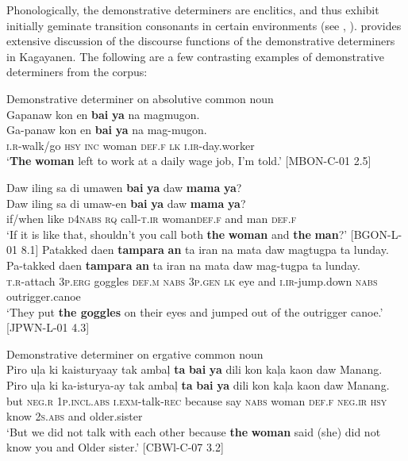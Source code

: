 Phonologically, the demonstrative determiners are enclitics, and thus exhibit initially geminate transition consonants in certain environments (see , ).  \citet{pebleyenclitic1999} provides extensive discussion of the discourse functions of the demonstrative determiners in Kagayanen. The following are a few contrasting examples of demonstrative determiners from the corpus:

\largerpage
\ea
Demonstrative determiner on absolutive common noun \\
Gapanaw  kon  en  \textbf{bai}  \textbf{ya}  na  magmugon. \\\smallskip
 \gll Ga-panaw  kon  en  \textbf{bai}  \textbf{ya}  na  mag-mugon. \\
\textsc{i.r}-walk/go  \textsc{hsy} \textsc{inc}  woman  \textsc{def.f}  \textsc{lk}  \textsc{i.ir}-day.worker \\
\glt ‘\textbf{The} \textbf{woman} left to work at a daily wage job, I’m told.’ [MBON-C-01 2.5]
\z

\newpage
\ea
\label{bkm:Ref447721085}
Daw  iling  sa  di  umawen  \textbf{bai}  \textbf{ya}  daw  \textbf{mama}  \textbf{ya}? \\\smallskip
 \gll Daw  iling  sa  di  umaw-en  \textbf{bai}  \textbf{ya}  daw  \textbf{mama}  \textbf{ya}? \\
if/when  like  \textsc{d4nabs}  \textsc{rq}  call-\textsc{t.ir}  woman\textsc{def.f}  and  man  \textsc{def.f} \\
\glt ‘If it is like that, shouldn’t you call both \textbf{the} \textbf{woman} and \textbf{the} \textbf{man}?’  [BGON-L-01 8.1]
\z
\ea
\label{ex:outriggercanoe}
Patakked	daen	\textbf{tampara}	\textbf{an}	ta	iran	na	mata	daw	magtugpa	ta	lunday. \\\smallskip
 \gll Pa-takked	daen	\textbf{tampara}	\textbf{an}	ta	iran	na	mata	daw	mag-tugpa	ta	lunday. \\
\textsc{t.r}-attach	3\textsc{p.erg}	goggles	\textsc{def.m}	\textsc{nabs}	3\textsc{p.gen}	\textsc{lk}	eye	and		\textsc{i.ir}-jump.down
\textsc{nabs}	outrigger.canoe \\
\glt ‘They put \textbf{the goggles} on their eyes and jumped out of the outrigger canoe.’ [JPWN-L-01 4.3]
\z

\ea
\label{bkm:Ref343005737} \label{ex:woman}
Demonstrative determiner on ergative common noun \\
Piro  uļa  ki  kaisturyaay  tak  ambaļ \textbf{ta}  \textbf{bai}  \textbf{ya}  dili  kon  kaļa  kaon  daw  Manang. \\\smallskip
 \gll Piro  uļa  ki  ka-isturya-ay  tak  ambaļ \textbf{ta}  \textbf{bai}  \textbf{ya}  dili  kon  kaļa  kaon  daw  Manang. \\
but  \textsc{neg.r}  1\textsc{p.incl.abs}  \textsc{i.exm}-talk-\textsc{rec}  because  say
\textsc{nabs}  woman  \textsc{def.f}  \textsc{neg.ir}  \textsc{hsy}  know  \textsc{2}\textsc{s.abs}  and  older.sister \\
\glt `But we did not talk with each other because \textbf{the} \textbf{woman} said (she) did not know you and Older sister.’ [CBWl-C-07 3.2]
\z

